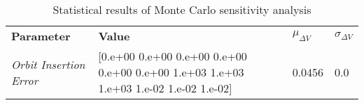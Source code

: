 
                    \begin{table}[]
                    \centering
                    \begin{tabular}{l l l l}
                    \rowcolor[HTML]{EFEFEF} \textbf{Parameter} & \textbf{Value} & \textbf{$\mu_{\Delta V}$} & \textbf{$\sigma_{\Delta V}$} \\
                    \textit{Orbit Insertion Error} & [0.e+00 0.e+00 0.e+00 0.e+00 0.e+00 0.e+00 1.e+03 1.e+03 1.e+03 1.e-02
 1.e-02 1.e-02] & 0.0456 & 0.0 \\

                    \end{tabular}
                    \caption{Statistical results of Monte Carlo sensitivity analysis}
                    \label{tab:SensitivityAnalysis}
                    \end{table}
                    